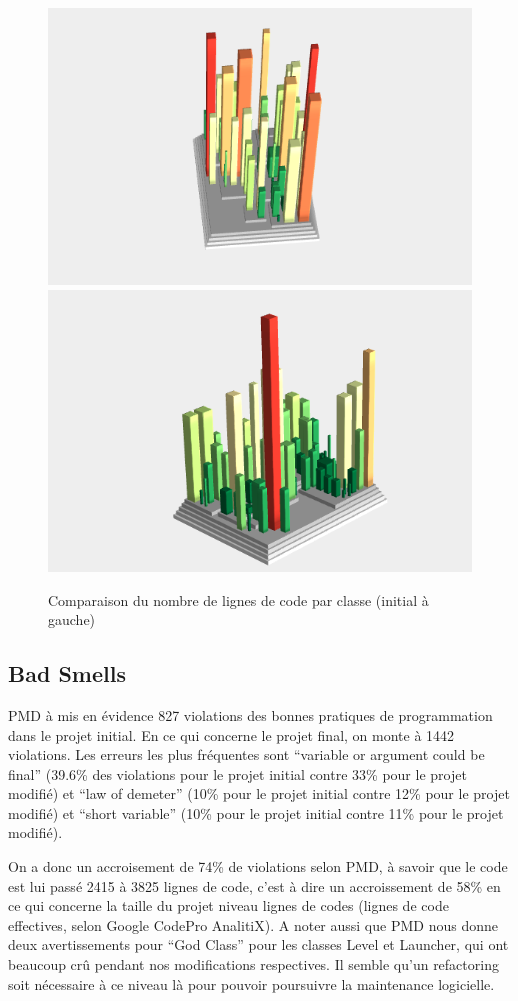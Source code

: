 \documentclass[a4paper,12pt]{report} %
\begin{document}
\begin{figure}[!h]
\includegraphics[scale=0.5]{ressources/final_initial_lines_of_code}\includegraphics[scale=0.5]{ressources/final_new_lines_of_code}\caption{Comparaison du nombre de lignes de code par classe (initial à gauche)}\label{figure9}


\end{figure}

\subsection{Bad Smells}
PMD à mis en évidence 827 violations des bonnes pratiques de programmation
dans le projet initial. En ce qui concerne le projet final, on monte
à 1442 violations. Les erreurs les plus fréquentes sont ``variable
or argument could be final'' (39.6\% des violations pour le projet
initial contre 33\% pour le projet modifié) et ``law of demeter''
(10\% pour le projet initial contre 12\% pour le projet modifié) et
``short variable'' (10\% pour le projet initial contre 11\% pour
le projet modifié).

On a donc un accroisement de 74\% de violations selon PMD, à savoir
que le code est lui passé 2415 à 3825 lignes de code, c'est à dire
un accroissement de 58\% en ce qui concerne la taille du projet niveau
lignes de codes (lignes de code effectives, selon Google CodePro AnalitiX).
A noter aussi que PMD nous donne deux avertissements pour ``God Class''
pour les classes Level et Launcher, qui ont beaucoup crû pendant nos
modifications respectives. Il semble qu'un refactoring soit nécessaire
à ce niveau là pour pouvoir poursuivre la maintenance logicielle.
\end{document}
